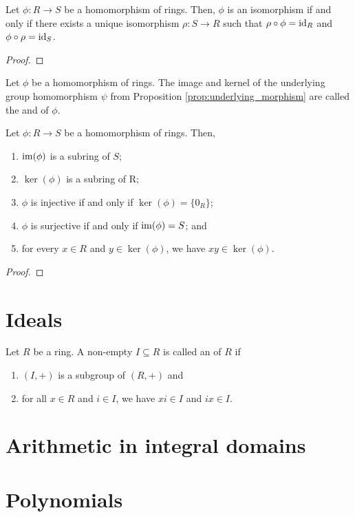 \begin{prop}
Let $ \phi:R\to S $ be a homomorphism of rings. Then, $ \phi $ is an isomorphism if and only if there exists a unique isomorphism $ \rho:S\to R $ such that $ \rho\circ\phi=\operatorname{id}_R $ and $ \phi\circ\rho=\operatorname{id}_S $.
\end{prop}
\begin{proof}
\end{proof}

\begin{defn}
Let $ \phi $ be a homomorphism of rings. The image and kernel of the underlying group homomorphism $ \psi $ from Proposition \ref{prop:underlying_morphism} are called the  and  of $ \phi $.
\end{defn}

\begin{prop}
Let $ \phi:R\to S $ be a homomorphism of rings. Then,
\begin{enumerate}
    \item $ \operatorname{im}(\phi) $ is a subring of $ S $;
    \item $ \ker(\phi) $ is a subring of R;
    \item $ \phi $ is injective if and only if $ \ker(\phi)=\{0_R\} $;
    \item $ \phi $ is surjective if and only if $ \operatorname{im}(\phi)=S $; and
    \item for every $ x\in R $ and $ y\in\ker(\phi) $, we have $ xy\in\ker(\phi) $.
\end{enumerate}
\end{prop}
\begin{proof}
\end{proof}

\section{Ideals}

\begin{defn}
Let $ R $ be a ring. A non-empty $ I\subseteq R $ is called an  of $ R $ if
\begin{enumerate}
    \item $ (I,+) $ is a subgroup of $ (R,+) $ and
    \item for all $ x\in R $ and $ i\in I $, we have $ xi\in I $ and $ ix\in I $.
\end{enumerate}
\end{defn}

\section{Arithmetic in integral domains}

\section{Polynomials}

